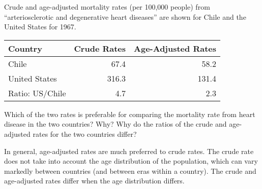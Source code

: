 
Crude and age-adjusted mortality rates (per 100,000 people) from
``arteriosclerotic and degenerative heart diseases'' are shown for
Chile and the United States for 1967.  

\begin{center}
\begin{tabular}{lrr}
Country & Crude Rates & Age-Adjusted Rates\\\hline
Chile & 67.4 & 58.2\\
United States & 316.3 & 131.4\\
Ratio: US/Chile & 4.7 & 2.3\\
\end{tabular}
\end{center}


Which of the two rates is preferable for comparing the mortality rate
from heart disease in the two countries?  Why?  Why do the ratios of
the crude and age-adjusted rates for the two countries differ?

\begin{AnswerText}
In general, age-adjusted rates are much preferred to crude rates.  The
crude rate does not take into account the age distribution of the
population, which can vary markedly between countries (and between
eras within a country).  The crude and age-adjusted rates differ when
the age distribution differs.
\end{AnswerText}


